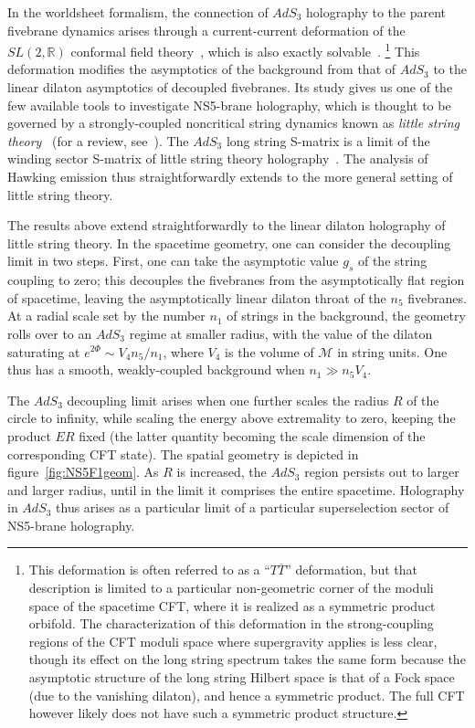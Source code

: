 \documentclass[11pt]{article}
\newcommand{\rcite}{\cite}
\def\sltwo{\ensuremath{SL(2,\bR)}}
\newcommand{\bR}{{\mathbb R}}
\numberwithin{equation}{section}
\def\cM{\mathcal {M}} \def\cN{\mathcal {N}} \def\cO{\mathcal {O}}
\begin{document}
In the worldsheet formalism, the connection of $AdS_3$ holography to the parent fivebrane dynamics arises through a current-current deformation of the $\sltwo$ conformal field theory~\rcite{Giveon:1999zm,Giveon:2017nie}, which is also exactly solvable~\rcite{Hassan:1992gi,Giveon:1993ph}.%
\footnote{This deformation is often referred to as a ``$T\overline T$'' deformation, but that description is limited to a particular non-geometric corner of the moduli space of the spacetime CFT, where it is realized as a symmetric product orbifold.  The characterization of this deformation in the strong-coupling regions of the CFT moduli space where supergravity applies is less clear, though its effect on the long string spectrum takes the same form because the asymptotic structure of the long string Hilbert space is that of a Fock space (due to the vanishing dilaton), and hence a symmetric product.  The full CFT however likely does not have such a symmetric product structure.}
This deformation modifies the asymptotics of the background from that of $AdS_3$ to the linear dilaton asymptotics of decoupled fivebranes.  Its study gives us one of the few available tools to investigate NS5-brane holography, which is thought to be governed by a strongly-coupled noncritical string dynamics known as {\it little string theory}~\rcite{Maldacena:1996ya,Seiberg:1997zk,Dijkgraaf:1997ku} (for a review, see~\rcite{Kutasov:2001uf}).  The $AdS_3$ long string S-matrix is a limit of the winding sector S-matrix of little string theory holography~\rcite{Aharony:2004xn}.
The analysis of Hawking emission thus straightforwardly extends to the more general setting of little string theory.


The results above extend straightforwardly to the linear dilaton holography of little string theory.
In the spacetime geometry, one can consider the decoupling limit in two steps.  First, one can take the asymptotic value $g_s$ of the string coupling to zero; this decouples the fivebranes from the asymptotically flat region of spacetime, leaving the asymptotically linear dilaton throat of the $n_5$ fivebranes.  At a radial scale set by the number $n_1$ of strings in the background, the geometry rolls over to an $AdS_3$ regime at smaller radius, with the value of the dilaton saturating at $e^{2\Phi}\sim V_4 n_5/n_1$, where $V_4$ is the volume of $\cM$ in string units.  One thus has a smooth, weakly-coupled background when $n_1\gg n_5 V_4$.  


The $AdS_3$ decoupling limit arises when one further scales the radius $R$ of the circle to infinity, while scaling the energy above extremality to zero, keeping the product $ER$ fixed (the latter quantity becoming the scale dimension of the corresponding CFT state).  The spatial geometry is depicted in figure~\ref{fig:NS5F1geom}.  As $R$ is increased, the $AdS_3$ region persists out to larger and larger radius, until in the limit it comprises the entire spacetime.  Holography in $AdS_3$ thus arises as a particular limit of a particular superselection sector of NS5-brane holography.
\end{document}
